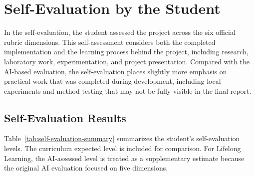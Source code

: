 \section{Self-Evaluation by the Student}
\label{section:self-evaluation}

In the self-evaluation, the student assessed the project across the
six official rubric dimensions. This self-assessment considers both
the completed implementation and the learning process behind the
project, including research, laboratory work, experimentation, and
project presentation. Compared with the AI-based evaluation, the
self-evaluation places slightly more emphasis on practical work that
was completed during development, including local experiments and
method testing that may not be fully visible in the final report.

\subsection{Self-Evaluation Results}
\label{subsection:self-evaluation-results}

Table~\ref{tab:self-evaluation-summary} summarizes the student's
self-evaluation levels. The curriculum expected level is included for
comparison. For Lifelong Learning, the AI-assessed level is treated as
a supplementary estimate because the original AI evaluation focused on
five dimensions.

